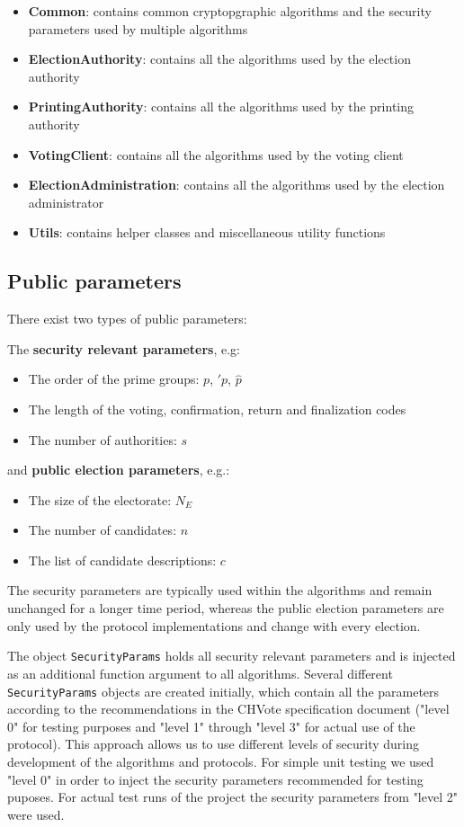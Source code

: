 \begin{itemize}
	\item \textbf{Common}: contains common cryptopgraphic algorithms and the security parameters used by multiple algorithms
	\item \textbf{ElectionAuthority}: contains all the algorithms used by the election authority
	\item \textbf{PrintingAuthority}: contains all the algorithms used by the printing authority
	\item \textbf{VotingClient}: contains all the algorithms used by the voting client
	\item \textbf{ElectionAdministration}: contains all the algorithms used by the election administrator
	\item \textbf{Utils}: contains helper classes and miscellaneous utility functions
\end{itemize}

\subsection{Public parameters}
There exist two types of public parameters:

The \textbf{security relevant parameters}, e.g:

\begin{itemize}
	\item The order of the prime groups: $p$, $\prime{p}$, $\hat{p}$
	\item The length of the voting, confirmation, return and finalization codes
	\item The number of authorities: $s$
\end{itemize}

and \textbf{public election parameters}, e.g.:

\begin{itemize}
	\item The size of the electorate: $N_E$
	\item The number of candidates: $n$
	\item The list of candidate descriptions: $c$
\end{itemize}

The security parameters are typically used within the algorithms and remain unchanged for a longer time period, whereas the public election parameters are only used by the protocol implementations and change with every election.

The object \texttt{SecurityParams} holds all security relevant parameters and is injected as an additional function argument to all algorithms. Several different \texttt{SecurityParams} objects are created initially, which contain all the parameters according to the recommendations in the CHVote specification document ("level 0" for testing purposes and "level 1" through "level 3" for actual use of the protocol). This approach allows us to use different levels of security during development of the algorithms and protocols. For simple unit testing we used "level 0" in order to inject the security parameters recommended for testing puposes. For actual test runs of the project the security parameters from "level 2" were used.

